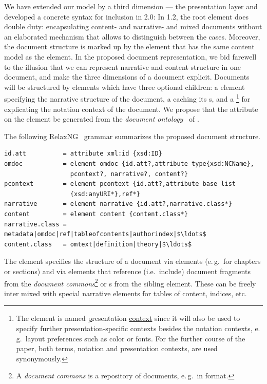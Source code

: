 \documentclass[a4paper]{article}
\begin{document}
We have extended our {\narcon} model by a third dimension --- the presentation layer and
developed a concrete syntax for inclusion in {\omdoc}2.0: In {\omdoc}1.2, the root element
{} does double duty: encapsulating content- and narrative- and mixed
documents without an elaborated mechanism that allows to distinguish between the
cases. Moreover, the document structure is marked up by the {} element
that has the same content model as the {} element. In the proposed document
representation, we bid farewell to the illusion that we can represent narrative and
content structure in one document, and make the three dimensions of a document explicit.
Documents will be structured by {} elements which have three optional
children: a {} element specifying the narrative structure of the
document, a {} caching its {\infom}s, and a
{}\footnote{The element is named \underline{p}resentation
  \underline{context} since it will also be used to specify further presentation-specific
  contexts besides the notation contexts, e.\,g.\ layout preferences such as color or
  fonts. For the further course of the paper, both terms, notation and presentation
  contexts, are used synonymously.} for explicating the notation context of the
document. We propose that the {} attribute on the {}
element be generated from the {\emph{document ontology}}~\cite{MW:lwa07} of {\omdoc}.

The following RelaxNG~\cite{Vlist:Relaxng} grammar summarizes the proposed document
structure.

\begin{lstlisting}[mathescape,numbers=none]
id.att          = attribute xml:id {xsd:ID}
omdoc           = element omdoc {id.att?,attribute type{xsd:NCName}, 
                  pcontext?, narrative?, content?}
pcontext        = element pcontext {id.att?,attribute base list
                  {xsd:anyURI*},ref*}
narrative       = element narrative {id.att?,narrative.class*}
content         = element content {content.class*}
narrative.class = metadata|omdoc|ref|tableofcontents|authorindex|$\ldots$
content.class   = omtext|definition|theory|$\ldots$
\end{lstlisting}

The {} element specifies the structure of a document via
{} elements (e.\,g.\ for chapters or sections) and via {}
elements that reference (i.e.\ include) document fragments from the {\emph{document
    commons}}\footnote{A {\emph{document commons}} is a repository of documents, e.\,g.\
  in {\omdoc} format.} or {\infom}s from the sibling {} element. These
can be freely inter mixed with special narrative elements for tables of content, indices,
etc.
\end{document}
